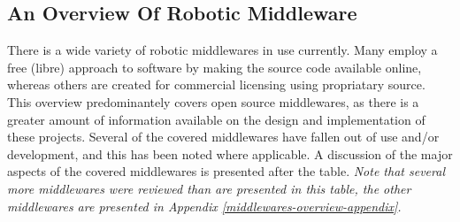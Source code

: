 \documentclass[../dissertation.tex]{subfiles}
\begin{document}
\subsection{An Overview Of Robotic Middleware}
\label{overview-of-robotic-middleware}

There is a wide variety of robotic middlewares in use currently. Many employ a free (libre) approach to software by making the source code available online, whereas others are created for commercial licensing using propriatary source. This overview predominantely covers open source middlewares, as there is a greater amount of information available on the design and implementation of these projects. Several of the covered middlewares have fallen out of use and/or development, and this has been noted where applicable. A discussion of the major aspects of the covered middlewares is presented after the table. \textit{Note that several more middlewares were reviewed than are presented in this table, the other middlewares are presented in Appendix \ref{middlewares-overview-appendix}.}
\end{document}
